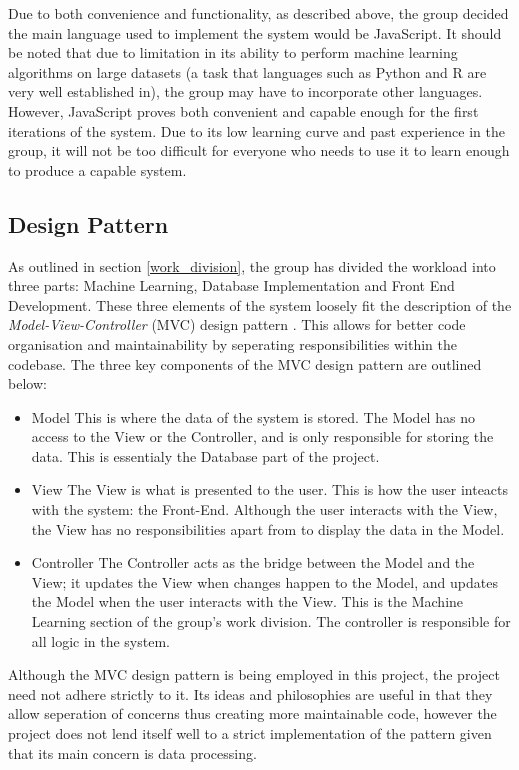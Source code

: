 \documentclass[titlepage]{article}
\begin{document}
Due to both convenience and functionality, as described above, the group decided the main language used to implement the system would be JavaScript. It should be noted that due to limitation in its ability to perform machine learning algorithms on large datasets (a task that languages such as Python and R are very well established in), the group may have to incorporate other languages. However, JavaScript proves both convenient and capable enough for the first iterations of the system. Due to its low learning curve and past experience in the group, it will not be too difficult for everyone who needs to use it to learn enough to produce a capable system.

\subsection{Design Pattern}
As outlined in section \ref{work_division}, the group has divided the workload into three parts: Machine Learning, Database Implementation and Front End Development. These three elements of the system loosely fit the description of the \textit{Model-View-Controller} (MVC) design pattern \cite{google_mvc}. This allows for better code organisation and maintainability \cite{google_mvc} by seperating responsibilities within the codebase. The three key components of the MVC design pattern are outlined below:
\begin{itemize}
  \item Model
  This is where the data of the system is stored. The Model has no access to the View or the Controller, and is only responsible for storing the data. This is essentialy the Database part of the project.
  \item View
  The View is what is presented to the user. This is how the user inteacts with the system: the Front-End. Although the user interacts with the View, the View has no responsibilities apart from to display the data in the Model.
  \item Controller
  The Controller acts as the bridge between the Model and the View; it updates the View when changes happen to the Model, and updates the Model when the user interacts with the View. This is the Machine Learning section of the group's work division. The controller is responsible for all logic in the system.
\end{itemize}

Although the MVC design pattern is being employed in this project, the project need not adhere strictly to it. Its ideas and philosophies are useful in that they allow seperation of concerns thus creating more maintainable code, however the project does not lend itself well to a strict implementation of the pattern given that its main concern is data processing.
\end{document}
